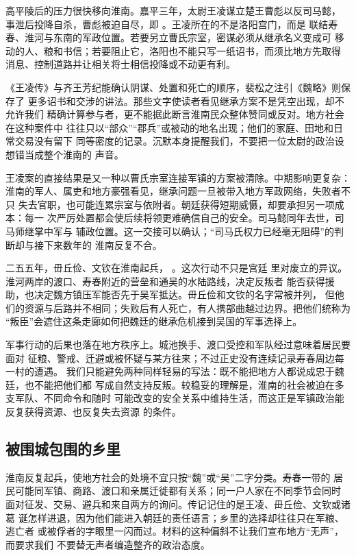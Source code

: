 高平陵后的压力很快移向淮南。嘉平三年，太尉王凌谋立楚王曹彪以反司马懿，
事泄后投降自杀，曹彪被迫自尽，即
。王凌所在的不是洛阳宫门，而是
联结寿春、淮河与东南的军政位置。若要另立曹氏宗室，密谋必须从继承名义变成可
移动的人、粮和书信；若要阻止它，洛阳也不能只写一纸诏书，而须比地方先取得
消息、控制道路并让相关将士相信投降或不动更有利。

《王凌传》与齐王芳纪能确认阴谋、处置和死亡的顺序，裴松之注引《魏略》则保存了
更多诏书和交涉的讲法。那些文字使读者看见继承方案不是凭空出现，却不允许我们
精确计算参与者，更不能据此断言淮南民众整体赞同或反对。地方社会在这种案件中
往往只以“部众”“郡兵”或被动的地名出现；他们的家庭、田地和日常交易没有留下
同等密度的记录。沉默本身提醒我们，不要把一位太尉的政治设想错当成整个淮南的
声音。

王凌案的直接结果是又一种以曹氏宗室连接军镇的方案被清除。中期影响更复杂：
淮南的军人、属吏和地方豪强看见，继承问题一旦被带入地方军政网络，失败者不只
失去官职，也可能连累宗室与依附者。朝廷获得短期威慑，却要承担另一项成本：每一
次严厉处置都会使后续将领更难确信自己的安全。司马懿同年去世，司马师继掌中军与
辅政位置。这一交接可以确认；“司马氏权力已经毫无阻碍”的判断却与接下来数年的
淮南反复不合。

二五五年，毌丘俭、文钦在淮南起兵，
。这次行动不只是宫廷
里对废立的异议。淮河两岸的渡口、寿春附近的营垒和通吴的水陆路线，决定反叛者
能否获得援助，也决定魏方镇压军能否先于吴军抵达。毌丘俭和文钦的名字常被并列，
但他们的资源与后路并不相同；失败后有人死亡，有人携部曲越过边界。把他们统称为
“叛臣”会遮住这条走廊如何把魏廷的继承危机接到吴国的军事选择上。

军事行动的后果也落在地方秩序上。城池换手、渡口受控和军队经过意味着居民要面对
征粮、警戒、迁避或被怀疑与某方往来；不过正史没有连续记录寿春周边每一村的遭遇。
我们只能避免两种同样轻易的写法：既不能把地方人都说成忠于魏廷，也不能把他们都
写成自然支持反叛。较稳妥的理解是，淮南的社会被迫在多支军队、不同命令和随时
可能改变的安全关系中维持生活，而这正是军镇政治能反复获得资源、也反复失去资源
的条件。

\subsection{被围城包围的乡里}

淮南反复起兵，使地方社会的处境不宜只按“魏”或“吴”二字分类。寿春一带的
居民可能同军镇、商路、渡口和亲属迁徙都有关系；同一户人家在不同季节会同时
面对征发、交易、避兵和来自两方的询问。传记记住的是王凌、毌丘俭、文钦或诸葛
诞怎样进退，因为他们能进入朝廷的责任语言；乡里的选择却往往只在军粮、逃亡者
或被俘者的字眼里一闪而过。材料的这种偏斜不让我们宣布地方“无声”，而要求我们
不要替无声者编造整齐的政治态度。


